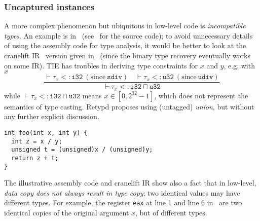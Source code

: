 \documentclass[compsoc,conference,a4paper,10pt,times]{IEEEtran}
\begin{document}
\subsubsection*{Uncaptured instances}
A more complex phenomenon but ubiquitous in low-level code is \emph{incompatible types}. An example is in~ 
(see~ for the source code); to avoid unnecessary details of using the assembly 
code for type analysis, it would be better to look at the cranelift IR~\cite{noauthor_cranelift_nodate} version given in~ 
(since the binary type recovery eventually works on some IR).
TIE has troubles in deriving type constraints for $x$ and $y$, 
e.g. with $x$
\begin{equation*}
  \frac{\vdash \tau_{x} <\colon \mathtt{i32} \medspace (\text{since} \medspace \mathtt{sdiv}) \quad \vdash \tau_{x} <\colon \mathtt{u32} \medspace (\text{since} \medspace \mathtt{udiv})}
       {\vdash \tau_{x} <\colon \mathtt{i32} \sqcap \mathtt{u32}}
\end{equation*}
while $\vdash \tau_{x} <\colon \mathtt{i32} \sqcap \mathtt{u32}$ means $x \in [0, 2^{32}-1]$, 
which does not represent the semantics of type casting. Retypd proposes using (untagged) \emph{union}, but without any further explicit 
discussion.
\begin{lstlisting}[style={c},caption={Signed and unsigned division (source)},label={lst:divisionc}]
int foo(int x, int y) {
  int z = x / y;
  unsigned t = (unsigned)x / (unsigned)y;
  return z + t;
}
\end{lstlisting}
The illustrative assembly code and cranelift IR show also a fact that in low-level, 
\emph{data copy does not always result in type copy}: two identical values 
may have different types. For example, 
the register \texttt{\small eax} at line 1 and line 6 in~ are two identical copies of 
the original argument $x$, but of different types.
\end{document}
